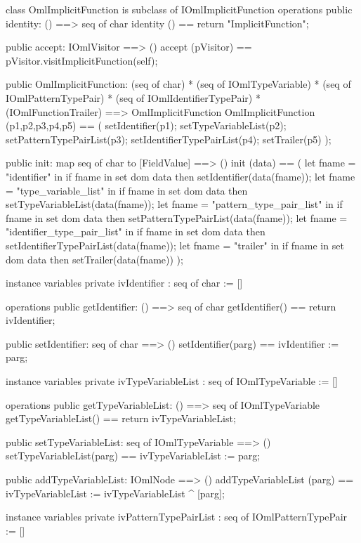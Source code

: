 \begin{vdm_al}
class OmlImplicitFunction is subclass of IOmlImplicitFunction
operations
  public identity: () ==> seq of char
  identity () == return "ImplicitFunction";

  public accept: IOmlVisitor ==> ()
  accept (pVisitor) == pVisitor.visitImplicitFunction(self);

  public OmlImplicitFunction:
      (seq of char) *
      (seq of IOmlTypeVariable) *
      (seq of IOmlPatternTypePair) *
      (seq of IOmlIdentifierTypePair) *
      (IOmlFunctionTrailer) ==> OmlImplicitFunction
  OmlImplicitFunction (p1,p2,p3,p4,p5) == 
   ( setIdentifier(p1);
     setTypeVariableList(p2);
     setPatternTypePairList(p3);
     setIdentifierTypePairList(p4);
     setTrailer(p5) );

  public init: map seq of char to [FieldValue] ==> ()
  init (data) ==
    ( let fname = "identifier" in
        if fname in set dom data
        then setIdentifier(data(fname));
      let fname = "type_variable_list" in
        if fname in set dom data
        then setTypeVariableList(data(fname));
      let fname = "pattern_type_pair_list" in
        if fname in set dom data
        then setPatternTypePairList(data(fname));
      let fname = "identifier_type_pair_list" in
        if fname in set dom data
        then setIdentifierTypePairList(data(fname));
      let fname = "trailer" in
        if fname in set dom data
        then setTrailer(data(fname)) );

instance variables
  private ivIdentifier : seq of char := []

operations
  public getIdentifier: () ==> seq of char
  getIdentifier() == return ivIdentifier;

  public setIdentifier: seq of char ==> ()
  setIdentifier(parg) == ivIdentifier := parg;

instance variables
  private ivTypeVariableList : seq of IOmlTypeVariable := []

operations
  public getTypeVariableList: () ==> seq of IOmlTypeVariable
  getTypeVariableList() == return ivTypeVariableList;

  public setTypeVariableList: seq of IOmlTypeVariable ==> ()
  setTypeVariableList(parg) == ivTypeVariableList := parg;

  public addTypeVariableList: IOmlNode ==> ()
  addTypeVariableList (parg) == ivTypeVariableList := ivTypeVariableList ^ [parg];

instance variables
  private ivPatternTypePairList : seq of IOmlPatternTypePair := []


\end{vdm_al}
